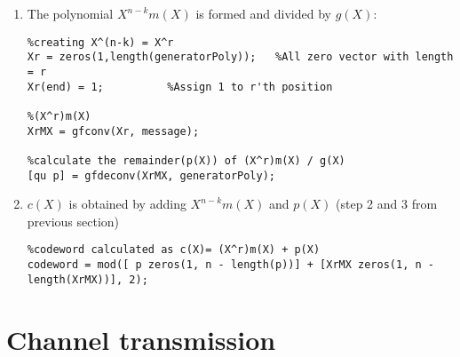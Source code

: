 \documentclass[Main]{subfiles}
\begin{document}
\begin{enumerate}
\item The polynomial $X^{n-k}m(X)$ is formed and divided by $g(X)$:
\begin{lstlisting}
%creating X^(n-k) = X^r
Xr = zeros(1,length(generatorPoly));   %All zero vector with length = r
Xr(end) = 1;          %Assign 1 to r'th position

%(X^r)m(X)
XrMX = gfconv(Xr, message);

%calculate the remainder(p(X)) of (X^r)m(X) / g(X) 
[qu p] = gfdeconv(XrMX, generatorPoly);
\end{lstlisting}

\item $c(X)$ is obtained by adding  $X^{n-k}m(X)$ and $p(X)$ (step 2 and 3 from previous section)

\begin{lstlisting}
%codeword calculated as c(X)= (X^r)m(X) + p(X)
codeword = mod([ p zeros(1, n - length(p))] + [XrMX zeros(1, n - length(XrMX))], 2);
\end{lstlisting}
\end{enumerate}



\section{Channel transmission}
\end{document}
